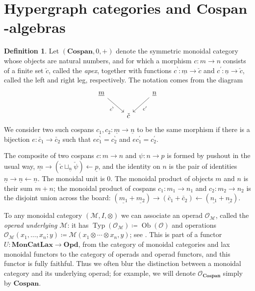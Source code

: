 \documentclass[11pt, article, oneside]{memoir}
\theoremstyle{plain}
\theoremstyle{definition}
\newtheorem{definition}[theorem]{Definition}
\theoremstyle{remark}
\newcommand{\cat}[1]{\mathcal{#1}}
\newcommand{\Cat}[1]{\mathbf{#1}}
\DeclareMathOperator{\Ob}{Ob}
\DeclareMathOperator{\Typ}{Typ}
\newcommand{\from}{\leftarrow}
\newcommand{\ul}[1]{\underline{#1}}
\newcommand{\Cospan}{\Cat{Cospan}}
\newcommand{\OO}{\cat{O}}
\newcommand{\lleg}[1]{#1^\backprime}
\newcommand{\rleg}[1]{#1^\prime}
\newcommand{\apex}[1]{\check{#1}}
\newcommand{\cmap}{c}
\begin{document}
\section{Hypergraph categories and $\Cospan$-algebras}

\begin{definition}
Let $(\Cospan,0,+)$ denote the symmetric monoidal category whose objects are natural numbers, and for which a morphism $\cmap\colon m\to n$ consists of a finite set $\apex{\cmap}$, called the \emph{apex}, together with functions $\lleg\cmap\colon\ul{m}\to\apex{\cmap}$ and $\rleg\cmap\colon\ul{n}\to\apex{\cmap}$, called the left and right leg, respectively. The notation comes from the diagram
\[
\begin{tikzcd}
	\ul{m}\ar[dr, "\lleg\cmap"']&&\ul{n}\ar[dl, "\rleg\cmap"]\\
	&\apex{\cmap}
\end{tikzcd}
\]
We consider two such cospans $\cmap_1,\cmap_2\colon \ul{m}\to \ul{n}$ to be the same morphism if there is a bijection $e\colon\apex{\cmap_1}\to\apex{\cmap_2}$ such that $e\lleg\cmap_1=\lleg\cmap_2$ and $e\rleg\cmap_1=\rleg\cmap_2$.

The composite of two cospans $\cmap\colon m\to n$ and $\psi\colon n\to p$ is formed by pushout in the usual way, $\ul{m}\to(\apex{\cmap}\sqcup_{\ul{n}}\apex{\psi})\from\ul{p}$, and the identity on $n$ is the pair of identities $\ul{n}\to \ul{n}\from \ul{n}$. The monoidal unit is $0$. The monoidal product of objects $m$ and $n$ is their sum $m+n$; the monoidal product of cospans $\cmap_1\colon m_1\to n_1$ and $\cmap_2\colon m_2\to n_2$ is the disjoint union across the board: $(\ul{m_1}+\ul{m_2})\to(\apex{\cmap_1}+\apex{\cmap_2})\from (\ul{n_1}+\ul{n_2})$.
\end{definition}

To any monoidal category $(\cat{M},I,\otimes)$ we can associate an operad $\OO_\cat{M}$, called the \emph{operad underlying $\cat{M}$}: it has $\Typ(\OO_\cat{M})\coloneqq\Ob(\cat{O})$ and operations $\OO_{\cat{M}}(x_1,\ldots,x_n;y)\coloneqq\cat{M}(x_1\otimes\cdots\otimes x_n,y)$; see \cite{Leinster:2004a}. This is part of a functor $U\colon\Cat{MonCatLax}\to\Cat{Opd}$, from the category of monoidal categories and lax monoidal functors to the category of operads and operad functors, and this functor is fully faithful. Thus we often blur the distinction between a monoidal category and its underlying operad; for example, we will denote $\OO_{\Cospan}$ simply by $\Cospan$.
\end{document}
